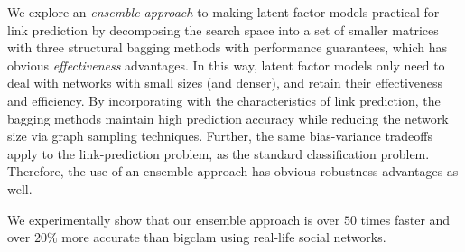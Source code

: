 We explore an {\em ensemble approach} to making latent factor models
practical for link prediction by decomposing the search space into a
 set of smaller matrices with three structural bagging methods with performance guarantees, which has obvious {\em
effectiveness} advantages. In this way, latent factor models only need to deal with networks with small sizes (and denser), and retain
their effectiveness and efficiency.  By incorporating with the characteristics of  link prediction, the bagging methods maintain high prediction
accuracy while reducing the network size via graph sampling techniques.
Further, the same bias-variance tradeoffs apply to the link-prediction problem, as the
standard classification problem. Therefore, the use of an ensemble
approach has obvious robustness advantages as well.


We experimentally show that our ensemble approach is over $50$ times faster and  over $20\%$ more accurate than {\sc bigclam} \cite{yang-wsdm2013} using real-life social networks.








